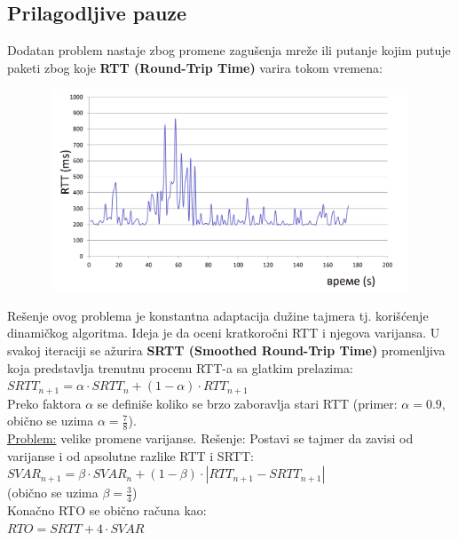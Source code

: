 \documentclass[a4paper]{article}
\begin{document}
    \subsection{Prilagodljive pauze}
        Dodatan problem nastaje zbog promene zagušenja mreže ili putanje kojim putuje paketi
        zbog koje \textbf{RTT (Round-Trip Time)} varira tokom vremena:
        \begin{figure}[H]
            \begin{center}
                \includegraphics[width=120mm,height=60mm]{Slike/tcp_retransmisija2.png}
            \end{center}
        \end{figure}
        Rešenje ovog problema je konstantna adaptacija dužine tajmera tj. korišćenje
        dinamičkog algoritma. Ideja je da oceni kratkoročni RTT i njegova varijansa. U svakoj
        iteraciji se ažurira \textbf{SRTT (Smoothed Round-Trip Time)} promenljiva koja predstavlja
        trenutnu procenu RTT-a sa glatkim prelazima: \\
        \indent \textbf{$SRTT_{n+1} = \alpha \cdot SRTT_{n} + (1-\alpha) \cdot RTT_{n+1}$}\\
        Preko faktora $\alpha$ se definiše koliko se brzo zaboravlja stari RTT (primer:
        $\alpha = 0.9$, obično se uzima $\alpha = \frac{7}{8}$). \\
        \indent \underline{Problem:} velike promene varijanse. Rešenje: Postavi se tajmer da zavisi od varijanse
        i od apsolutne razlike RTT i SRTT: \\ 
        \indent \textbf{$SVAR_{n+1} = \beta \cdot SVAR_{n} + (1 - \beta) \cdot |RTT_{n+1}-SRTT_{n+1}|$}\\
        (obično se uzima $\beta = \frac{3}{4}$)\\
        Konačno RTO se obično računa kao:\\
        \indent \textbf{$RTO = SRTT + 4\cdot SVAR$}\\
\end{document}

